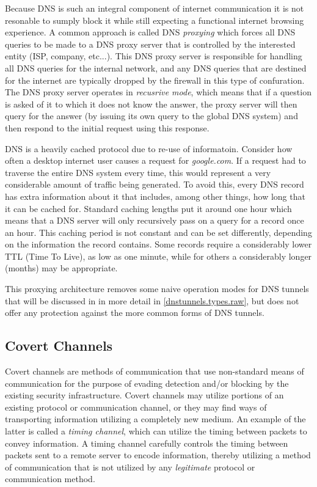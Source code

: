 \documentclass{article}
\theoremstyle{remark}
\theoremstyle{definition}
\theoremstyle{definition}
\theoremstyle{definition}
\begin{document}
Because DNS is such an integral component of internet communication it is not
resonable to sumply block it while still expecting a functional internet
browsing experience. A common approach is called DNS \emph{proxying} which
forces all DNS queries to be made to a DNS proxy server that is controlled by
the interested entity (ISP, company, etc...). This DNS proxy server is
responsible for handling all DNS queries for the internal network, and any DNS
queries that are destined for the internet are typically dropped by the
firewall in this type of confuration. The DNS proxy server operates in
\emph{recusrive mode}, which means that if a question is asked of it to which
it does not know the answer, the proxy server will then query for the answer (by
issuing its own query to the global DNS system) and then respond to the initial
request using this response.

DNS is a heavily cached protocol due to re-use of
informatoin. Consider how often a desktop internet user causes a request for
\emph{google.com}. If a request had to traverse the entire DNS system every
time, this would represent a very considerable amount of traffic being
generated. To avoid this, every DNS record has extra information about it that
includes, among other things, how long that it can be cached for. Standard
caching lengths put it around one hour which means that a DNS server will only
recursively pass on a query for a record once an hour. This caching period is
not constant and can be set differently, depending on the information the
record contains. Some records require a considerably lower TTL (Time To Live),
as low as one minute, while for others a considerably longer (months) may be
appropriate.

This proxying architecture removes some naive operation modes for DNS tunnels
that will be discussed in in more detail in \ref{dnstunnels.types.raw}, but does
not offer any protection against the more common forms of DNS tunnels.

\subsection{Covert Channels}

Covert channels are methods of communication that use non-standard means of
communication for the purpose of evading detection and/or blocking by the
existing security infrastructure. Covert channels may utilize
portions of an existing protocol or communication channel, or they may find
ways of transporting information utilizing a completely new medium. An example
of the latter is called a \emph{timing channel}, which can utilize the timing
between packets to convey information. A timing channel carefully controls the
timing between packets sent to a remote server to encode information, thereby
utilizing a method of communication that is not utilized by any
\emph{legitimate} protocol or communication method.
\end{document}

